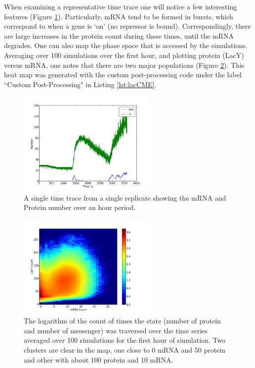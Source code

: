 When examining a representative time trace one will notice a few interesting features (Figure \ref{fig:lacBursts}). Particularly, mRNA tend to be formed in bursts, which correspond to when a gene is `on' (no repressor is bound).  Correspondingly, there are large increases in the protein count during these times, until the mRNA degrades.  One can also map the phase space that is accessed by the simulations.  Averaging over 100 simulations over the first hour, and plotting protein (LacY) versus mRNA, one notes that there are two major populations (Figure \ref{fig:lacHeatmap}).  This heat map was generated with the custom post-processing code under the label ``Custom Post-Processing" in Listing \ref{lst:lacCME}.

\begin{figure}[h!]
  \centering
        \includegraphics[width=0.6\textwidth]{Figures/LacBursts.png}
        \caption{A single time trace from a single replicate showing the mRNA and Protein number over an hour period.  } \label{fig:lacBursts}
\end{figure}

\begin{figure}[h!]
  \centering
        \includegraphics[width=0.6\textwidth]{Figures/LacYmRNAHeatmap.png}
        \caption{The logarithm of the count of times the state (number of protein and number of messenger) was traversed over the time series averaged over 100 simulations for the first hour of simulation. Two clusters are clear in the map, one close to 0 mRNA and 50 protein and other with about 100 protein and 10 mRNA.} \label{fig:lacHeatmap}
\end{figure}



